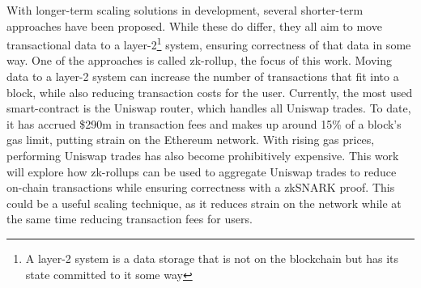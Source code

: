 \documentclass[11pt,twoside,a4paper,final]{book}
\begin{document}
With longer-term scaling solutions in development, several shorter-term approaches have been proposed. While these do differ, they all aim to move transactional data to a layer-2\footnote{A layer-2 system is a data storage that is not on the blockchain but has its state committed to it some way} system, ensuring correctness of that data in some way. One of the approaches is called zk-rollup, the focus of this work. Moving data to a layer-2 system can increase the number of transactions that fit into a block, while also reducing transaction costs for the user. Currently, the most used smart-contract is the Uniswap router, which handles all Uniswap trades. To date, it has accrued \$290m in transaction fees and makes up around 15\% of a block's gas limit, putting strain on the Ethereum network. With rising gas prices, performing Uniswap trades has also become prohibitively expensive. This work will explore how zk-rollups can be used to aggregate Uniswap trades to reduce on-chain transactions while ensuring correctness with a zkSNARK proof. This could be a useful scaling technique, as it reduces strain on the network while at the same time reducing transaction fees for users.






\end{document}

